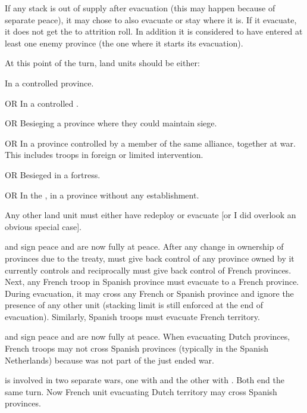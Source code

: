  If any stack is out of supply after
evacuation (this may happen because of separate peace), it may chose to also
evacuate or stay where it is.
\bparag If it evacuate, it does not get the  to attrition roll. In
addition it is considered to have entered at least one enemy province (the one
where it starts its evacuation).

\aparag[Memento]
\bparag At this point of the turn, land units should be either:
\begin{modlist}
\item In a controlled province.
\item[OR] In a controlled \Presidio.
\item[OR] Besieging a province where they could maintain siege.
\item[OR] In a province controlled by a member of the same alliance, together
  at war. This includes troops in foreign or limited intervention.
\item[OR] Besieged in a fortress.
\item[OR] In the \ROTW, in a province without any establishment.
\end{modlist}
\bparag Any other land unit must either have redeploy or evacuate [or I did
overlook an obvious special case].

\begin{exemple}
  \FRA and \HIS sign peace and are now fully at peace. After any change in
  ownership of provinces due to the treaty, \FRA must give back control of any
  province owned by \HIS it currently controls and reciprocally \HIS must give
  back control of French provinces. Next, any French troop in Spanish province
  must evacuate to a French province. During evacuation, it may cross any
  French or Spanish province and ignore the presence of any other unit
  (stacking limit is still enforced at the end of evacuation). Similarly,
  Spanish troops must evacuate French territory.
\end{exemple}

\begin{exemple}
  \FRA and \HOL sign peace and are now fully at peace. When evacuating Dutch
  provinces, French troops may not cross Spanish provinces (typically in the
  Spanish Netherlands) because \HIS was not part of the just ended war.

  \smallskip

  \FRA is involved in two separate wars, one with \HIS and the other with
  \HOL. Both end the same turn. Now French unit evacuating Dutch territory may
  cross Spanish provinces.
\end{exemple}

